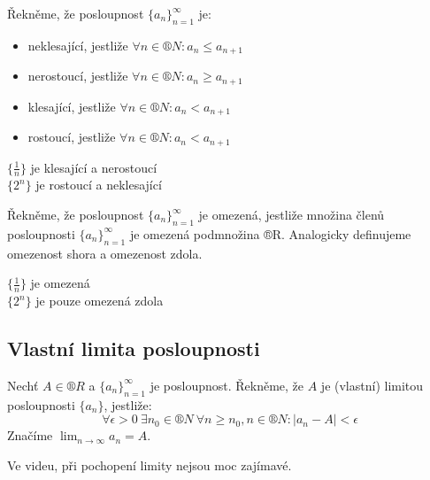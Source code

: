 \documentclass[12pt]{article}					%
\begin{document}
        \begin{definice}
            Řekněme, že posloupnost $\{a_n\}_{n=1}^∞$ je:
            \begin{itemize}
                \item neklesající, jestliže $\forall n \in ®N: a_n ≤ a_{n+1}$
                \item nerostoucí, jestliže $\forall n \in ®N: a_n ≥ a_{n+1}$
                \item klesající, jestliže $\forall n \in ®N: a_n < a_{n+1}$
                \item rostoucí, jestliže $\forall n \in ®N: a_n < a_{n+1}$
            \end{itemize}
            \begin{prikladyin}
                $\{\frac{1}{n}\}$ je klesající a nerostoucí\\
                $\{2^n\}$ je rostoucí a neklesající
            \end{prikladyin}
        \end{definice}

        \begin{definice}
            Řekněme, že posloupnost $\{a_n\}_{n = 1}^∞$ je omezená, jestliže množina členů posloupnosti $\{a_n\}_{n = 1}^∞$ je omezená podmnožina ®R. Analogicky definujeme omezenost shora a omezenost zdola.
            \begin{prikladyin}
                $\{\frac{1}{n}\}$ je omezená\\
                $\{2^n\}$ je pouze omezená zdola
            \end{prikladyin}
        \end{definice}

    \subsection{Vlastní limita posloupnosti}
        \begin{definice}[Limita]
            Nechť $A \in ®R$ a $\{a_n\}_{n = 1}^∞$ je posloupnost. Řekněme, že $A$ je (vlastní) limitou posloupnosti $\{a_n\}$, jestliže:
            $$ \forall \epsilon > 0\ \exists n_0 \in ®N\ \forall n≥ n_0, n \in ®N: |a_n - A|<\epsilon $$ 
            Značíme $\lim_{n \rightarrow ∞} a_n = A$.

            \begin{prikladyin}
                Ve videu, při pochopení limity nejsou moc zajímavé.
            \end{prikladyin}
        \end{definice}
\end{document}
